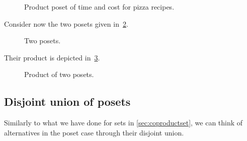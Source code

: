 \begin{figure}[h!]
  \begin{center}
  \end{center}
  \caption{Product poset of time and cost for pizza recipes.\label{fig:productpizza}}
\end{figure}


\begin{example}
  Consider now the two posets given in~\cref{fig:composing_posets_1}.
  \begin{figure}[h!]
    \begin{center}
    \end{center}
    \caption{Two posets. \label{fig:composing_posets_1}}
  \end{figure}
  Their product is depicted in~\cref{fig:composing_posets_2}.
  \begin{figure}[h!]
    \begin{center}
    \end{center}
    \caption{Product of two posets. \label{fig:composing_posets_2}}
  \end{figure}
\end{example}

\subsection{Disjoint union of posets}

Similarly to what we have done for sets in \cref{sec:coproductset}, we can think of alternatives in the poset case through their disjoint union.

